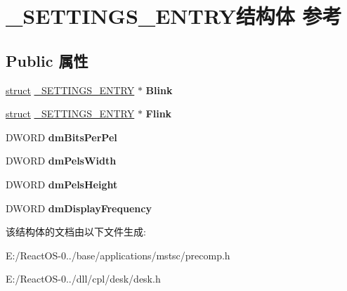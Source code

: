 \hypertarget{struct___s_e_t_t_i_n_g_s___e_n_t_r_y}{}\section{\+\_\+\+S\+E\+T\+T\+I\+N\+G\+S\+\_\+\+E\+N\+T\+R\+Y结构体 参考}
\label{struct___s_e_t_t_i_n_g_s___e_n_t_r_y}
\subsection*{Public 属性}
\begin{DoxyCompactItemize}
\item 
\mbox{\label{struct___s_e_t_t_i_n_g_s___e_n_t_r_y_ab31d614af9040838b7138a7a283f9b9e}} 
\hyperlink{interfacestruct}{struct} \hyperlink{struct___s_e_t_t_i_n_g_s___e_n_t_r_y}{\+\_\+\+S\+E\+T\+T\+I\+N\+G\+S\+\_\+\+E\+N\+T\+RY} $\ast$ {\bfseries Blink}
\item 
\mbox{\label{struct___s_e_t_t_i_n_g_s___e_n_t_r_y_a98761ba1fc7065c097c8202490e555b0}} 
\hyperlink{interfacestruct}{struct} \hyperlink{struct___s_e_t_t_i_n_g_s___e_n_t_r_y}{\+\_\+\+S\+E\+T\+T\+I\+N\+G\+S\+\_\+\+E\+N\+T\+RY} $\ast$ {\bfseries Flink}
\item 
\mbox{\label{struct___s_e_t_t_i_n_g_s___e_n_t_r_y_accc0a4042d86face0b093c56a5288a8b}} 
D\+W\+O\+RD {\bfseries dm\+Bits\+Per\+Pel}
\item 
\mbox{\label{struct___s_e_t_t_i_n_g_s___e_n_t_r_y_adbe920d68b7c461e31a6df0ea7dcec79}} 
D\+W\+O\+RD {\bfseries dm\+Pels\+Width}
\item 
\mbox{\label{struct___s_e_t_t_i_n_g_s___e_n_t_r_y_a1792e1c0f20db5e485704fdd62c627b5}} 
D\+W\+O\+RD {\bfseries dm\+Pels\+Height}
\item 
\mbox{\label{struct___s_e_t_t_i_n_g_s___e_n_t_r_y_a97c444d09684237235adc9f73cd4d3e0}} 
D\+W\+O\+RD {\bfseries dm\+Display\+Frequency}
\end{DoxyCompactItemize}


该结构体的文档由以下文件生成\+:\begin{DoxyCompactItemize}
\item 
E\+:/\+React\+O\+S-\/0../base/applications/mstsc/precomp.\+h\item 
E\+:/\+React\+O\+S-\/0../dll/cpl/desk/desk.\+h\end{DoxyCompactItemize}
